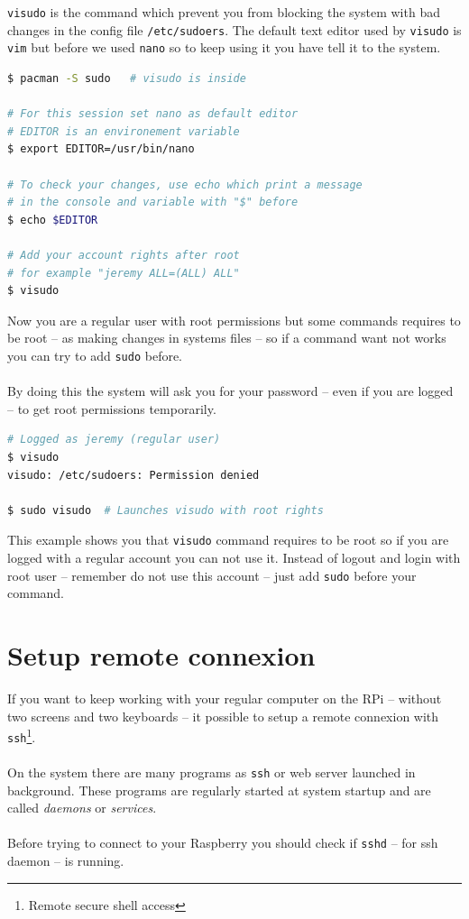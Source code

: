 \texttt{visudo} is the command which prevent you from blocking the system with 
bad changes in the config file \texttt{/etc/sudoers}. The default text editor 
used by \texttt{visudo} is \texttt{vim} but before we used \texttt{nano} so to 
keep using it you have tell it to the system.
\newpage
\begin{lstlisting}[language=bash,caption=Specify user rights]
$ pacman -S sudo   # visudo is inside

# For this session set nano as default editor
# EDITOR is an environement variable
$ export EDITOR=/usr/bin/nano

# To check your changes, use echo which print a message
# in the console and variable with "$" before
$ echo $EDITOR

# Add your account rights after root
# for example "jeremy ALL=(ALL) ALL"
$ visudo
\end{lstlisting}

Now you are a regular user with root permissions but some commands requires
to be root  -- as making changes in systems files -- so if a command want not 
works you can try to add \texttt{sudo} before. 
\\\\
By doing this the system will ask 
you for your password -- even if you are logged -- to get root permissions 
temporarily.

\begin{lstlisting}[language=bash,caption=sudo command usage]
# Logged as jeremy (regular user)
$ visudo
visudo: /etc/sudoers: Permission denied

$ sudo visudo  # Launches visudo with root rights
\end{lstlisting}

This example shows you that \texttt{visudo} command requires to be root so if 
you are logged with a regular account you can not use it. Instead of logout and 
login with root user -- remember do not use this account -- just add 
\texttt{sudo} before your command.

\section{Setup remote connexion}
If you want to keep working with your regular computer on the RPi -- without two 
screens and two keyboards -- it possible to setup a remote connexion with 
\texttt{ssh}\footnote{Remote secure shell access}.
\\\\
On the system there are many programs as \texttt{ssh}  or web server launched 
in background. These programs are regularly started at system startup and 
are called \emph{daemons} or \emph{services}. 
\\\\
Before trying to connect to 
your Raspberry you should check if \texttt{sshd} -- for ssh daemon -- is running.

